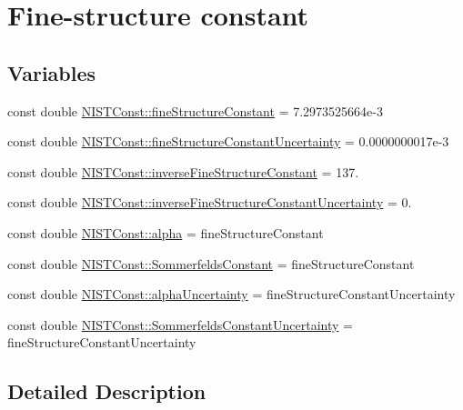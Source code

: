 \hypertarget{group___fine_structure_constant}{}\section{Fine-\/structure constant}
\label{group___fine_structure_constant}
\subsection*{Variables}
\begin{DoxyCompactItemize}
\item 
const double \hyperlink{group___fine_structure_constant_ga0f1ddaca2627b7253ed177aa1b074724}{N\+I\+S\+T\+Const\+::fine\+Structure\+Constant} = 7.\+2973525664e-\/3
\item 
const double \hyperlink{group___fine_structure_constant_ga18067d14fb16cc6418212812405e6496}{N\+I\+S\+T\+Const\+::fine\+Structure\+Constant\+Uncertainty} = 0.\+0000000017e-\/3
\item 
const double \hyperlink{group___fine_structure_constant_gaa4cd257f5376577cf0331e71dd952bb6}{N\+I\+S\+T\+Const\+::inverse\+Fine\+Structure\+Constant} = 137.
\item 
const double \hyperlink{group___fine_structure_constant_gae26a4808ef23039e47ea7fc6d971d420}{N\+I\+S\+T\+Const\+::inverse\+Fine\+Structure\+Constant\+Uncertainty} = 0.
\item 
const double \hyperlink{group___fine_structure_constant_gac2d74edeb9ba449e5e687a2cdbb139e9}{N\+I\+S\+T\+Const\+::alpha} = fine\+Structure\+Constant
\item 
const double \hyperlink{group___fine_structure_constant_gaa076e4b419cd726407c8e2e9a44a381b}{N\+I\+S\+T\+Const\+::\+Sommerfelds\+Constant} = fine\+Structure\+Constant
\item 
const double \hyperlink{group___fine_structure_constant_ga861407c811dfb66edddeb6ad55f5bdae}{N\+I\+S\+T\+Const\+::alpha\+Uncertainty} = fine\+Structure\+Constant\+Uncertainty
\item 
const double \hyperlink{group___fine_structure_constant_ga4ad54e49e7d0bde74be46b2e97c25dfd}{N\+I\+S\+T\+Const\+::\+Sommerfelds\+Constant\+Uncertainty} = fine\+Structure\+Constant\+Uncertainty
\end{DoxyCompactItemize}


\subsection{Detailed Description}


